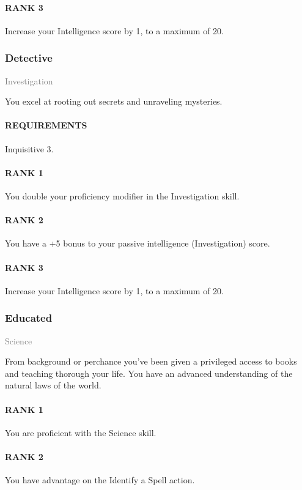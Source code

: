 \paragraph{RANK 3} Increase your Intelligence score by 1, to a maximum of 20.

\subsubsection{Detective} \label{feat::detective}
\small{\textcolor{gray}{Investigation}}

\normalsize
You excel at rooting out secrets and unraveling mysteries.
\paragraph{REQUIREMENTS} Inquisitive 3.
\paragraph{RANK 1} You double your proficiency modifier in the Investigation skill.
\paragraph{RANK 2} You have a +5 bonus to your passive intelligence (Investigation) score.
\paragraph{RANK 3} Increase your Intelligence score by 1, to a maximum of 20.

\subsubsection{Educated} \label{feat::educated}
\small{\textcolor{gray}{Science}}

\normalsize
From background or perchance you've been given a privileged access to books and teaching thorough your life.
You have an advanced understanding of the natural laws of the world.
\paragraph{RANK 1} You are proficient with the Science skill.
\paragraph{RANK 2} You have advantage on the Identify a Spell action.
